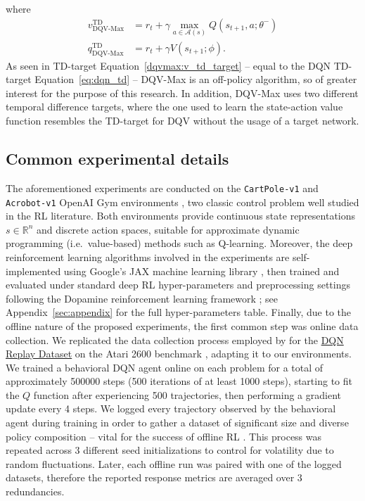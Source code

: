 where
\begin{align}
  v^{\scriptscriptstyle \textrm{TD}}_{\scriptscriptstyle
  \textrm{DQV-Max}}&=r_t+\gamma\max_{a\in\mathcal{A}\left(s\right)}Q\left(s_{t+1},a;\theta^{-}\right)
  \label{dqvmax:v_td_target}\\
  q^{\scriptscriptstyle \textrm{TD}}_{\scriptscriptstyle \textrm{DQV-Max}}&=r_t+\gamma
  V\left(s_{t+1};\phi\right).
\end{align} As seen in TD-target
Equation~\ref{dqvmax:v_td_target} -- equal to the DQN TD-target
Equation~\ref{eq:dqn_td} -- DQV-Max is an off-policy algorithm, so
of greater interest for the purpose of this research. In addition,
DQV-Max uses two different temporal difference targets, where the one
used to learn the state-action value function resembles the TD-target
for DQV without the usage of a target network.

\subsection{Common experimental details}
The aforementioned experiments are conducted on the
\texttt{CartPole-v1} and \texttt{Acrobot-v1} OpenAI Gym environments
\citep{https://doi.org/10.48550/arxiv.1606.01540}, two classic control
problem well studied in the RL literature. Both environments
provide continuous state representations $s\in \mathbb{R}^n$ and
discrete action spaces, suitable for approximate dynamic programming
(i.e.\ value-based) methods such as Q-learning. Moreover, the
deep reinforcement learning algorithms involved in the experiments are
self-implemented using Google's JAX machine learning library
\citep{jax2018github}, then trained and evaluated under standard deep
RL hyper-parameters and preprocessing settings following the Dopamine
reinforcement
learning framework \citep{castro18dopamine}; see
Appendix~\ref{sec:appendix} for the full hyper-parameters
table. Finally, due to the offline nature of the proposed experiments,
the first common step was online data collection. We replicated the
data collection process employed by \citet{agarwal2020optimistic} for
the \href{https://research.google/tools/datasets/dqn-replay/}{DQN
  Replay Dataset} on the Atari 2600 benchmark
\citep{bellemare2013arcade}, adapting it to our environments. We
trained a behavioral DQN agent online on each problem for a total of
approximately 500000 steps (500 iterations of at least 1000 steps),
starting to fit the $Q$ function after experiencing 500
trajectories, then performing a gradient update every 4 steps. We
logged every trajectory observed by the behavioral agent during
training in order to gather a dataset of significant size and diverse
policy composition -- vital for the success of offline RL
\citep{agarwal2020optimistic}. This process was repeated across 3
different seed initializations to control for volatility due to random
fluctuations. Later, each offline run was paired with one of the
logged datasets, therefore the reported response metrics are averaged
over 3 redundancies.

